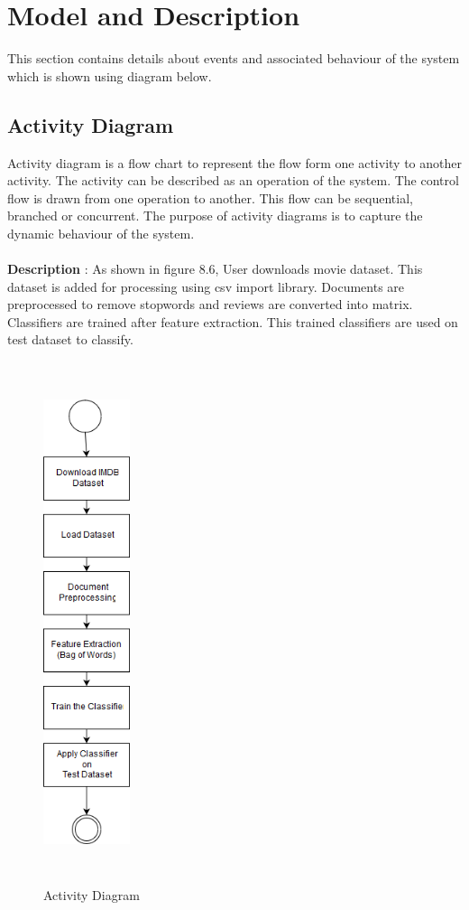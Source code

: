 \documentclass[oneside,a4paper,12pt]{pictreport}
\begin{document}
\section{Model and Description}
This section contains details about events and associated behaviour of the system which is shown using diagram below.

\subsection{Activity Diagram}
Activity diagram is a flow chart to represent the flow form one activity to another activity. The activity can be described as an operation of the system. The control flow is drawn from one operation to another. This flow can be sequential, branched or concurrent. The purpose of activity diagrams is to capture the dynamic behaviour of the system.\\\\
\textbf{Description} : As shown in figure 8.6, User downloads movie dataset. This dataset is added for processing using csv import 
library. Documents are preprocessed to remove stopwords and reviews are converted into matrix. Classifiers are trained after feature extraction. This trained classifiers are used on test dataset to classify.
\begin{figure}[h!]
\begin{center}
 

\includegraphics[width=1.0in,height=6.0in]{Activity.png}
\caption{Activity Diagram}
\end{center}

\end{figure}
\newpage
\end{document}
